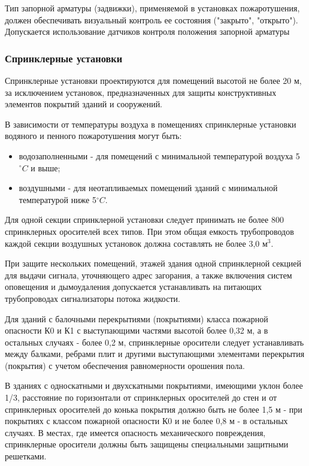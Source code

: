 Тип запорной арматуры (задвижки), применяемой в установках пожаротушения, должен обеспечивать визуальный контроль ее состояния
("закрыто", "открыто"). Допускается использование датчиков контроля положения запорной арматуры

\subsubsection{Спринклерные установки}

Спринклерные установки проектируются для помещений высотой не более 20 м, за исключением установок, предназначенных для защиты
конструктивных элементов покрытий зданий и сооружений.

В зависимости от температуры воздуха в помещениях спринклерные установки водяного и пенного пожаротушения могут быть:
\begin{itemize}
\item водозаполненными - для помещений с минимальной температурой воздуха 5${^\circ{C}}$ и выше;
\item воздушными - для неотапливаемых помещений зданий с минимальной температурой ниже 5${^\circ{C}}$.
\end{itemize}

Для одной секции спринклерной установки следует принимать не более 800 спринклерных оросителей всех типов.
При этом общая емкость трубопроводов каждой секции воздушных установок должна составлять не более 3,0 м$^3$.

При защите нескольких помещений, этажей здания одной спринклерной секцией для выдачи сигнала, уточняющего адрес загорания, а также
включения систем оповещения и дымоудаления допускается устанавливать на питающих трубопроводах сигнализаторы потока жидкости.

Для зданий с балочными перекрытиями (покрытиями) класса пожарной опасности К0 и К1 с выступающими частями высотой более 0,32 м, а
в остальных случаях - более 0,2 м, спринклерные оросители следует устанавливать между балками, ребрами плит и другими выступающими
элементами перекрытия (покрытия) с учетом обеспечения равномерности орошения пола.

В зданиях с односкатными и двухскатными покрытиями, имеющими уклон более 1/3, расстояние по горизонтали от спринклерных оросителей
до стен и от спринклерных оросителей до конька покрытия должно быть не более 1,5 м - при покрытиях с классом пожарной опасности
К0 и не более 0,8 м - в остальных случаях. В местах, где имеется опасность механического повреждения, спринклерные оросители
должны быть защищены специальными защитными решетками.

